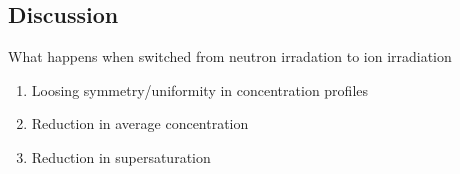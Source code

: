 \documentclass[a4paper]{article}
\begin{document}
%
%
%
%
\newpage
  \subsection{Discussion} \hspace{10pt}
  What happens when switched from neutron irradation to ion irradiation
  \begin{enumerate}
    \item Loosing symmetry/uniformity in concentration profiles
    \item Reduction in average concentration
    \item Reduction in supersaturation
  \end{enumerate}
\end{document}
